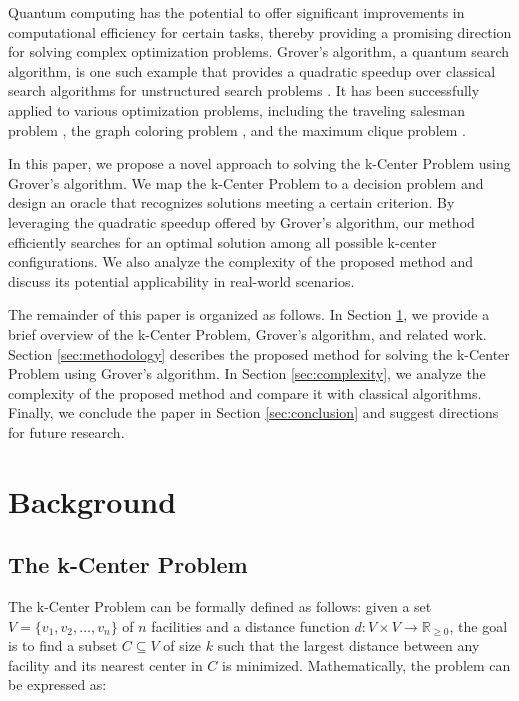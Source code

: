 Quantum computing has the potential to offer significant improvements in computational efficiency for certain tasks, thereby providing a promising direction for solving complex optimization problems. Grover's algorithm, a quantum search algorithm, is one such example that provides a quadratic speedup over classical search algorithms for unstructured search problems \cite{grover1996fast}. It has been successfully applied to various optimization problems, including the traveling salesman problem \cite{zalka1999grover}, the graph coloring problem \cite{childs2000quantum}, and the maximum clique problem \cite{ambainis2003quantum}.

In this paper, we propose a novel approach to solving the k-Center Problem using Grover's algorithm. We map the k-Center Problem to a decision problem and design an oracle that recognizes solutions meeting a certain criterion. By leveraging the quadratic speedup offered by Grover's algorithm, our method efficiently searches for an optimal solution among all possible k-center configurations. We also analyze the complexity of the proposed method and discuss its potential applicability in real-world scenarios.

The remainder of this paper is organized as follows. In Section \ref{sec:background}, we provide a brief overview of the k-Center Problem, Grover's algorithm, and related work. Section \ref{sec:methodology} describes the proposed method for solving the k-Center Problem using Grover's algorithm. In Section \ref{sec:complexity}, we analyze the complexity of the proposed method and compare it with classical algorithms. Finally, we conclude the paper in Section \ref{sec:conclusion} and suggest directions for future research.

\section{Background}
\label{sec:background}

\subsection{The k-Center Problem}
The k-Center Problem can be formally defined as follows: given a set $V = \{v_1, v_2, \ldots, v_n\}$ of $n$ facilities and a distance function $d: V \times V \rightarrow \mathbb{R}_{\geq 0}$, the goal is to find a subset $C \subseteq V$ of size $k$ such that the largest distance between any facility and its nearest center in $C$ is minimized. Mathematically, the problem can be expressed as:

